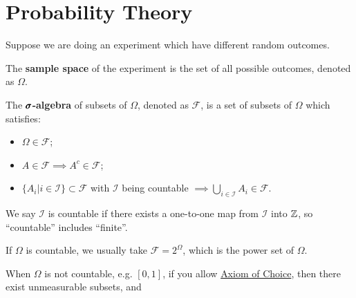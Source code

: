\section{Probability Theory}

Suppose we are doing an experiment which have different random outcomes.

\begin{definition}
    The \textbf{sample space} of the experiment is the set of all possible outcomes, denoted as $\Omega$.
\end{definition}

\begin{definition}
    The $\pmb{\sigma}$\textbf{-algebra} of subsets of $\Omega$, denoted as $\mathcal{F}$, is a set of subsets of $\Omega$ which satisfies:
    \begin{itemize}
        \item $\Omega \in \mathcal{F}$;
        \item $A \in \mathcal{F} \implies A^c \in \mathcal{F}$;
        \item $\{ A_i | i \in \mathcal{I} \} \subset \mathcal{F}$ with $\mathcal{I}$ being countable $\implies \bigcup\limits_{i \in \mathcal{I}} A_i \in \mathcal{F}$.
    \end{itemize}
\end{definition}

\begin{remark}
    We say $\mathcal{I}$ is countable if there exists a one-to-one map from $\mathcal{I}$ into $\mathbb{Z}$, so ``countable'' includes ``finite''.
\end{remark}

\begin{example}
    If $\Omega$ is countable, we usually take \textcolor{myblue}{$\mathcal{F} = 2^\Omega$}, which is the \textcolor{myblue}{power set of $\Omega$}.
\end{example}

\begin{example}
    When $\Omega$ is not countable, e.g. $[0,1]$, if you allow \href{https://en.wikipedia.org/wiki/Axiom_of_choice}{Axiom of Choice}, then there exist unmeasurable subsets, and 
\end{example}